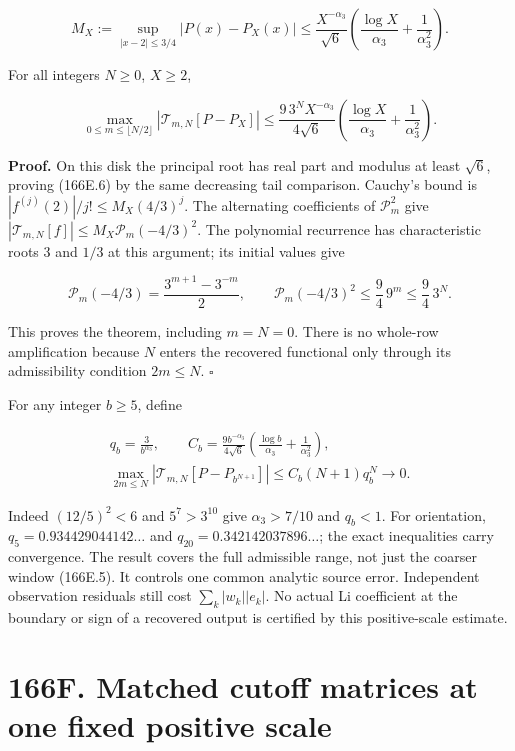 \documentclass[
  11pt,
]{book}
\begin{document}
\[
M_X:=\sup_{|x-2|\le3/4}|P(x)-P_X(x)|
\le\frac{X^{-\alpha_3}}{\sqrt6}
 \left(\frac{\log X}{\alpha_3}+\frac1{\alpha_3^2}\right).
\tag{166E.6}
\]

For all integers \(N\ge0\), \(X\ge2\),

\[
\boxed{\max_{0\le m\le\lfloor N/2\rfloor}
 |\mathcal T_{m,N}[P-P_X]|
\le\frac{9\,3^NX^{-\alpha_3}}{4\sqrt6}
 \left(\frac{\log X}{\alpha_3}+\frac1{\alpha_3^2}\right).}
\tag{166E.7}
\]

\textbf{Proof.} On this disk the principal root has real part and
modulus at least \(\sqrt6\), proving (166E.6) by the same decreasing
tail comparison. Cauchy's bound is \(|f^{(j)}(2)|/j!\le M_X(4/3)^j\).
The alternating coefficients of \(\mathcal P_m^2\) give
\(|\mathcal T_{m,N}[f]|\le M_X\mathcal P_m(-4/3)^2\). The polynomial
recurrence has characteristic roots \(3\) and \(1/3\) at this argument;
its initial values give

\[
\mathcal P_m(-4/3)=\frac{3^{m+1}-3^{-m}}2,
\qquad \mathcal P_m(-4/3)^2\le\frac94\,9^m\le\frac94\,3^N.
\tag{166E.8}
\]

This proves the theorem, including \(m=N=0\). There is no whole-row
amplification because \(N\) enters the recovered functional only through
its admissibility condition \(2m\le N\). \(\square\)

For any integer \(b\ge5\), define

\[
\begin{gathered}
q_b=\frac3{b^{\alpha_3}},\qquad
C_b=\frac{9b^{-\alpha_3}}{4\sqrt6}
 \left(\frac{\log b}{\alpha_3}+\frac1{\alpha_3^2}\right),\\
\max_{2m\le N}|\mathcal T_{m,N}[P-P_{b^{N+1}}]|
\le C_b(N+1)q_b^N\longrightarrow0.
\end{gathered}
\tag{166E.9}
\]

Indeed \((12/5)^2<6\) and \(5^7>3^{10}\) give \(\alpha_3>7/10\) and
\(q_b<1\). For orientation, \(q_5=0.934429044142\ldots\) and
\(q_{20}=0.342142037896\ldots\); the exact inequalities carry
convergence. The result covers the full admissible range, not just the
coarser window (166E.5). It controls one common analytic source error.
Independent observation residuals still cost \(\sum_k|w_k||e_k|\). No
actual Li coefficient at the boundary or sign of a recovered output is
certified by this positive-scale estimate.

\section{166F. Matched cutoff matrices at one fixed positive
scale}\label{f.-matched-cutoff-matrices-at-one-fixed-positive-scale}
\end{document}
